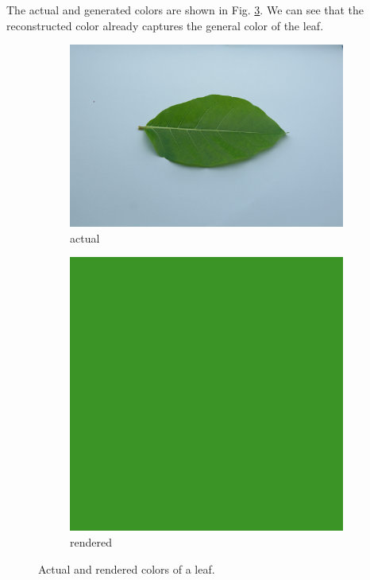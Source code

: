 \documentclass[12pt,a4paper]{article}
\begin{document}
\noindent
The actual and generated colors are shown in Fig. \ref{fig:render}. We can see that the reconstructed color already captures the general color of the leaf.

\begin{figure}[htb]
	\centering
	\begin{subfigure}[h!]{0.49\textwidth}
		\includegraphics[width=\textwidth]{leaf1.png}
		\caption{actual}
		\label{fig:leaf-actual}
	\end{subfigure}
	\begin{subfigure}[h!]{0.33\textwidth}
		\includegraphics[width=\textwidth]{render.png}
		\caption{rendered}
		\label{fig:leaf-render}
	\end{subfigure}
	\caption{Actual and rendered colors of a leaf.}
	\label{fig:render}
\end{figure}
\end{document}
